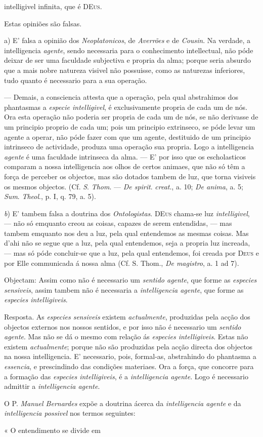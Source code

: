 intelligivel infinita, que é \textsc{DEus}.\par Estas opiniões são falsas.\par a) E' falsa a opinião dos \emph{Neoplatonicos}, de \emph{Averrões} e de \emph{Cousin}. Na verdade, a intelligencia \emph{agente}, sendo necessaria para o conhecimento intellectual, não póde deixar de ser uma faculdade subjectiva e propria da alma; porque seria absurdo que a mais nobre natureza visivel não possuisse, como as naturezas inferiores, tudo quanto é necessario para a sua operação.\par {}--- Demais, a consciencia attesta que a operação, pela qual abstrahimos dos phantasmas a \emph{especie intelligivel}, é exclusivamente propria de cada um de nós. Ora esta operação não poderia ser propria de cada um de nós, se não derivasse de um principio proprio de cada um; pois um principio extrinseco, se póde levar um agente a operar, não póde fazer com que um agente, destituido de um principio intrinseco de actividade, produza uma operação sua propria. Logo a intelligencia \emph{agente} é uma faculdade intrinseca da alma. --- E' por isso que os escholasticos comparam a nossa intelligencia aos olhos de certos animaes, que não só têm a força de perceber os objectos, mas são dotados tambem de luz, que torna visiveis os mesmos objectos. (Cf. \emph{S}. \emph{Thom}. --- \emph{De spirit}. \emph{creat}., a. 10; \emph{De anima}, a. 5; \emph{Sum}. \emph{Theol}., p. I, q. 79, a. 5).\par \emph{b}) E' tambem falsa a doutrina dos \emph{Ontologistas}. \textsc{DEus} chama-se luz \emph{intelligivel}, --- não só emquanto creou as coisas, capazes de serem entendidas, --- mas tambem emquanto nos deu a luz, pela qual entendemos as mesmas coisas. Mas d'ahi não se segue que a luz, pela qual entendemos, seja a propria luz increada, --- mas só póde concluir-se que a luz, pela qual entendemos, foi creada por \textsc{Deus} e por Elle communicada á nossa alma (Cf. S. Thom., \emph{De magistro}, a. 1 ad 7).\par Objectam: Assim como não é necessario um \emph{sentido agente}, que forme as \emph{especies sensiveis}, assim tambem não é necessaria a \emph{intelligencia agente}, que forme as \emph{especies intelligiveis}.\par Resposta. As \emph{especies sensiveis} existem \emph{actualmente}, produzidas pela acção dos objectos externos nos nossos sentidos, e por isso não é necessario um \emph{sentido agente}. Mas não se dá o mesmo com relação ás \emph{especies intelligiveis}. Estas não existem \emph{actualmente}; porque não são produzidas pela acção directa dos objectos na nossa intelligencia. E' necessario, pois, formal-as, abstrahindo do phantasma a \emph{essencia}, e prescindindo das condições materiaes. Ora a força, que concorre para a formação das \emph{especies intelligiveis}, é a \emph{intelligencia agente}. Logo é necessario admittir a \emph{intelligencia agente}.\par O P. \emph{Manuel Bernardes} expõe a doutrina ácerca da \emph{intelligencia agente} e da \emph{intelligencia possivel} nos termos seguintes:\par « O entendimento se divide em 